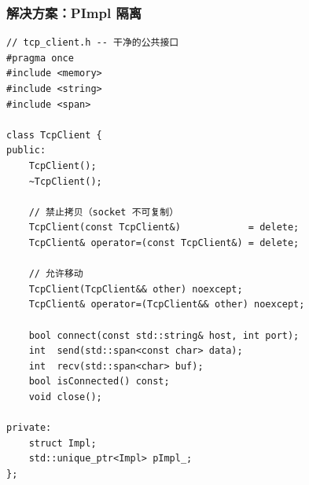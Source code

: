 \documentclass[12pt,a4paper,fontset=fandol]{ctexbook}
\begin{document}
\subsubsection*{解决方案：PImpl 隔离}

\begin{lstlisting}[caption={网络类——PImpl 隔离 WinSock（头文件）}]
// tcp_client.h -- 干净的公共接口
#pragma once
#include <memory>
#include <string>
#include <span>

class TcpClient {
public:
    TcpClient();
    ~TcpClient();

    // 禁止拷贝（socket 不可复制）
    TcpClient(const TcpClient&)            = delete;
    TcpClient& operator=(const TcpClient&) = delete;

    // 允许移动
    TcpClient(TcpClient&& other) noexcept;
    TcpClient& operator=(TcpClient&& other) noexcept;

    bool connect(const std::string& host, int port);
    int  send(std::span<const char> data);
    int  recv(std::span<char> buf);
    bool isConnected() const;
    void close();

private:
    struct Impl;
    std::unique_ptr<Impl> pImpl_;
};
\end{lstlisting}
\end{document}
